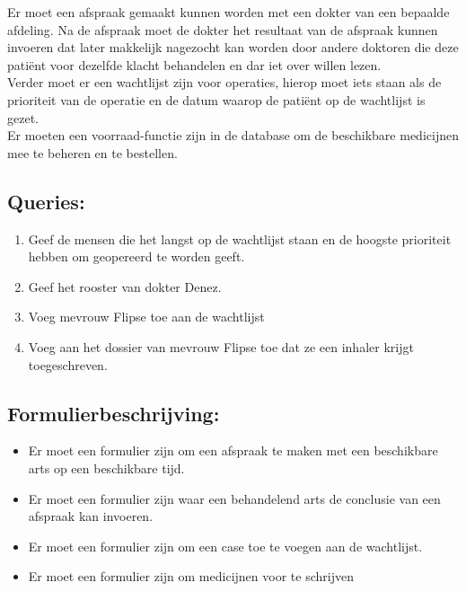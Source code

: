 
Er moet een afspraak gemaakt kunnen worden met een dokter van een bepaalde
afdeling.
Na de afspraak moet de dokter het resultaat van de afspraak kunnen invoeren dat later makkelijk nagezocht kan worden door andere doktoren die deze pati\"ent
voor dezelfde klacht behandelen en dar iet over willen lezen.\\
Verder moet er een wachtlijst zijn voor operaties, hierop moet iets staan als de
prioriteit van de operatie en de datum waarop de pati\"ent op de wachtlijst is
gezet.\\
Er moeten een voorraad-functie zijn in de database om de beschikbare medicijnen
mee te beheren en te bestellen.


\subsection*{Queries:}
\begin{enumerate}

\item Geef de mensen die het langst op de wachtlijst staan
   en de hoogste prioriteit hebben om geopereerd te worden geeft.

  \item Geef het rooster van dokter Denez.
  \item Voeg mevrouw Flipse toe aan de wachtlijst
  \item Voeg aan het dossier van mevrouw Flipse toe dat ze een inhaler krijgt toegeschreven.

\end{enumerate}

\subsection*{Formulierbeschrijving:}
\begin{itemize}
\item Er moet een formulier zijn om een afspraak te maken met een beschikbare arts op een beschikbare tijd.
\item Er moet een formulier zijn waar een behandelend arts de conclusie van een afspraak kan invoeren.
\item Er moet een formulier zijn om een case toe te voegen aan de wachtlijst.
\item Er moet een formulier zijn om medicijnen voor te schrijven
\end{itemize}